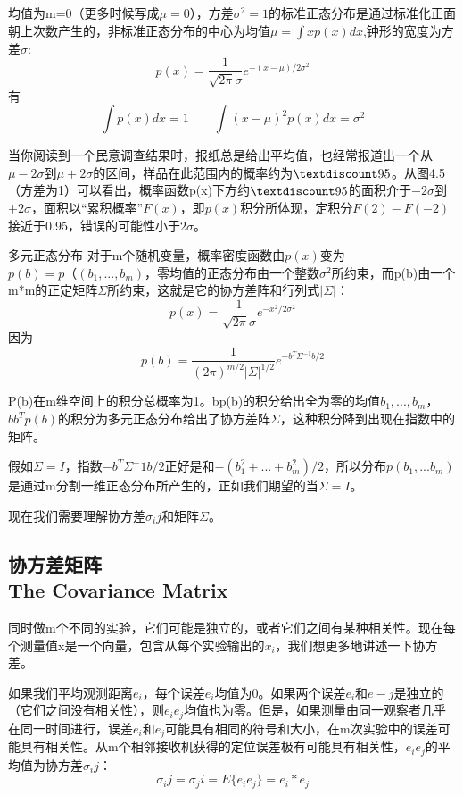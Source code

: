 	均值为m=0（更多时候写成$\mu=0$），方差$\sigma^2=1$的标准正态分布是通过标准化正面朝上次数产生的，非标准正态分布的中心为均值$\mu=\int xp(x)dx$,钟形的宽度为方差$\sigma$:
	\begin{equation}
	p(x)=\frac{1}{\sqrt{2\pi}\sigma}e^{-(x-\mu)/2\sigma^{2}}
	\end{equation}
	有
	\begin{equation*}
	\int p(x)dx=1 \qquad \int(x-\mu)^2p(x)dx=\sigma^2
	\end{equation*}
	
	当你阅读到一个民意调查结果时，报纸总是给出平均值，也经常报道出一个从$\mu-2\sigma$到$\mu+2\sigma$的区间，样品在此范围内的概率约为$\textdiscount95$。从图4.5（方差为1）可以看出，概率函数p(x)下方约$\textdiscount95$的面积介于$-2\sigma$到$+2\sigma$，面积以“累积概率”$F(x)$，即$p(x)$积分所体现，定积分$F(2)-F(-2)$接近于0.95，错误的可能性小于$2\sigma$。
	
	多元正态分布  \quad  对于m个随机变量，概率密度函数由$p(x)$变为$p(b)=p（(b_1,...,b_m)$，零均值的正态分布由一个整数$\sigma^2$所约束，而p(b)由一个m*m的正定矩阵$\Sigma$所约束，这就是它的协方差阵和行列式$|\Sigma|$：
	\begin{equation*}
	p(x)=\frac{1}{\sqrt{2\pi}\sigma}e^{-x^2/2\sigma^2}
	\end{equation*}
	因为
	\begin{equation*}
	p(b)=\frac{1}{(2\pi)^{m/2}|\Sigma|^{1/2}}e^{-b^{T}\Sigma^{-1}b/2}
	\end{equation*}
	
	P(b)在m维空间上的积分总概率为1。bp(b)的积分给出全为零的均值$b_1,...,b_m$，$bb^Tp(b)$的积分为多元正态分布给出了协方差阵$\Sigma$，这种积分降到出现在指数中的矩阵。
	
	假如$\Sigma=I$，指数$-b^T\Sigma^-1b/2$正好是和$-(b^2_1+...+b^2_m)/2$，所以分布$p(b_1,...b_m)$是通过m分割一维正态分布所产生的，正如我们期望的当$\Sigma=I$。
	
	现在我们需要理解协方差$\sigma_ij$和矩阵$\Sigma$。
	
	\subsection[协方差矩阵]{协方差矩阵\\The Covariance Matrix}
	同时做m个不同的实验，它们可能是独立的，或者它们之间有某种相关性。现在每个测量值x是一个向量，包含从每个实验输出的$x_i$，我们想更多地讲述一下协方差。
	
	如果我们平均观测距离$e_i$，每个误差$e_i$均值为0。如果两个误差$e_i$和$e-j$是独立的（它们之间没有相关性），则$e_ie_j$均值也为零。但是，如果测量由同一观察者几乎在同一时间进行，误差$e_i$和$e_j$可能具有相同的符号和大小，在m次实验中的误差可能具有相关性。从m个相邻接收机获得的定位误差极有可能具有相关性，$e_ie_j$的平均值为协方差$\sigma_ij$：
	\begin{equation}
	\sigma_ij=\sigma_ji=E\{e_ie_j\}=e_i*e_j
	\end{equation}
	
